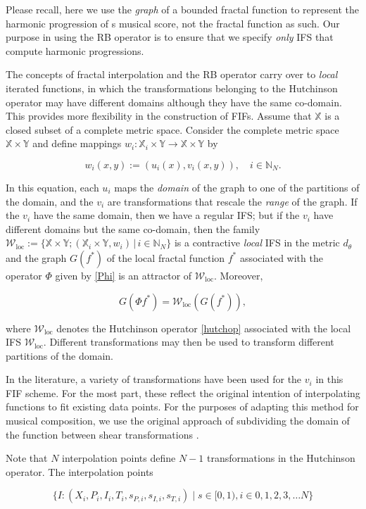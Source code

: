 \documentclass[english,11pt,letterpaper,onecolumn]{scrartcl}
\numberwithin{equation}{section}
\newcommand{\st}{\,|\,}
\newcommand{\N}{\mathbb{N}}
\newcommand{\X}{\mathbb{X}}
\newcommand{\Y}{\mathbb{Y}}
\newcommand{\cW}{\mathcal{W}}
\newcommand{\be}{\begin{equation}}
\newcommand{\ee}{\end{equation}}
\newcommand{\loc}{\mathrm{loc}}
\begin{document}
Please recall, here we use the \textit{graph} of a bounded fractal function to
represent the harmonic progression of s musical score, not the fractal function
as such. Our purpose in using the RB operator is to ensure that we specify
\textit{only} IFS that compute harmonic progressions.

The concepts of fractal interpolation and the RB operator carry over to
\textit{local} iterated functions, in which the transformations belonging to the
Hutchinson operator may have different domains although they have the same
co-domain. This provides more flexibility in the construction of FIFs. Assume
that $\X$ is a closed subset of a complete metric space. Consider the complete
metric space $\X\times\Y$ and define mappings $w_i:\X_i\times\Y\to\X\times\Y$ by

\be\label{IfsForFif}
w_i (x, y) := (u_i (x), v_i (x,y)), \quad i\in \N_N.
\ee

In this equation, each $u_i$ maps the \emph{domain} of the graph to one of the
partitions of the domain, and the $v_i$ are transformations that rescale
the \emph{range} of the graph. If the $v_i$ have the same domain, then we have a
regular IFS; but if the $v_i$ have different domains but the same co-domain,
then the family $\cW_\loc := \{\X\times\Y; (\X_i\times\Y, w_i)\st i\in \N_N\}$
is a contractive \textit{local} IFS in the metric $d_\theta$ and the graph
$G(f^*)$ of the local fractal function $f^*$ associated with the operator $\Phi$
given by \eqref{Phi} is an attractor of $\cW_\loc$. Moreover,

\be\label{GW}
G(\Phi f^*) = \cW_\loc (G(f^*)),
\ee

\noindent where $\cW_\loc$ denotes the Hutchinson operator \eqref{hutchop}
associated with the local IFS $\cW_\loc$. Different transformations may then be
used to transform different partitions of the domain.

In the literature, a variety of transformations have been used for the $v_i$ in
this FIF scheme. For the most part, these reflect the original intention of
interpolating functions to fit existing data points. For the purposes of
adapting this method for musical composition, we use the original approach of
subdividing the domain of the function between shear transformations
\cite{Navascues:2014}.

Note that $N$ interpolation points define $N-1$ transformations in the
Hutchinson operator. The interpolation points

\be\label{interpolationPoints}\{I : (X_i, P_i, I_i, T_i,
s_{P,i}, s_{I,i}, s_{T,i}) \mid s \in [0, 1), i \in 0, 1, 2, 3, \dots N \}
\ee
\end{document}
